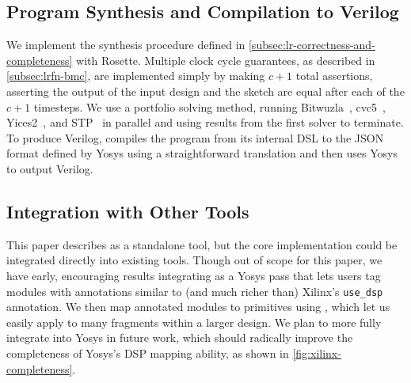

\subsection{Program Synthesis and Compilation to Verilog}
\label{sec:implementation:program-synthesis}

We implement
  the synthesis procedure
  defined in \cref{subsec:lr-correctness-and-completeness}
  with Rosette.
Multiple clock cycle guarantees,
  as described in \cref{subsec:lrfn-bmc},
  are implemented simply by making $c+1$
  total assertions,
  asserting the output of the input design
  and the sketch are equal
  after each of the $c+1$ timesteps.
We use a portfolio solving
  method, running
  Bitwuzla~\cite{niemetz2020bitwuzla},
  cvc5~\cite{barbosa22cvc5},
  Yices2~\cite{dutertre2006yices,dutertre2014yices},
  and STP~\cite{stp}
  in parallel
  and using results from the first
  solver to terminate.
To produce Verilog,
  \lr compiles the program from its internal DSL
  to the JSON format defined
  by Yosys using a straightforward translation 
  and then uses Yosys to output Verilog.


\subsection{Integration with Other Tools}

This paper describes \lr
  as a standalone tool,
  but the core \lr implementation
  could be integrated directly into
  existing tools.
Though out of scope for this paper,
  we have early,
  encouraging results
  integrating \lr
  as a Yosys pass
  that lets users tag modules
  with annotations similar to 
  (and much richer than) Xilinx's
  \texttt{use\_dsp} annotation.
We then map annotated modules 
  to primitives using \lr,
  which let us easily apply \lr to
  many fragments within a larger design.
We plan to more fully
  integrate \lr into Yosys in future work,
  which should radically improve the completeness
  of Yosys's DSP mapping ability,
  as shown in \cref{fig:xilinx-completeness}.
